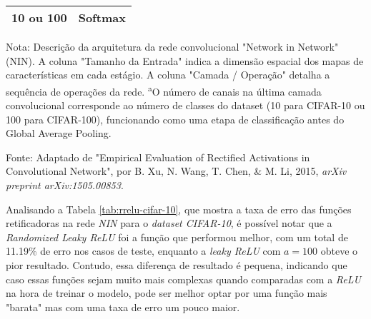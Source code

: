 \begin{table}[ht]
\begin{threeparttable}
\begin{tabular}{ll}
            10 ou 100 & Softmax \\
            
            \bottomrule
        \end{tabular}
        
        \begin{tablenotes}[para]
            \small
            \item[] Nota: Descrição da arquitetura da rede convolucional "Network in Network" (NIN). A coluna "Tamanho da Entrada" indica a dimensão espacial dos mapas de características em cada estágio. A coluna "Camada / Operação" detalha a sequência de operações da rede. \textsuperscript{a}O número de canais na última camada convolucional corresponde ao número de classes do dataset (10 para CIFAR-10 ou 100 para CIFAR-100), funcionando como uma etapa de classificação antes do Global Average Pooling.
            \item[] Fonte: Adaptado de "Empirical Evaluation of Rectified Activations in Convolutional Network", por B. Xu, N. Wang, T. Chen, \& M. Li, 2015, \textit{arXiv preprint arXiv:1505.00853}.
        \end{tablenotes}
        
    \end{threeparttable}
\end{table}

Analisando a Tabela \ref{tab:rrelu-cifar-10}, que mostra a taxa de erro das funções retificadoras na rede \textit{NIN} para o \textit{dataset CIFAR-10}, é possível notar que a \textit{Randomized Leaky ReLU} foi a função que performou melhor, com um total de 11.19\% de erro nos casos de teste, enquanto a \textit{leaky ReLU} com $a = 100$ obteve o pior resultado. Contudo, essa diferença de resultado é pequena, indicando que caso essas funções sejam muito mais complexas quando comparadas com a \textit{ReLU} na hora de treinar o modelo, pode ser melhor optar por uma função mais "barata" mas com uma taxa de erro um pouco maior.

